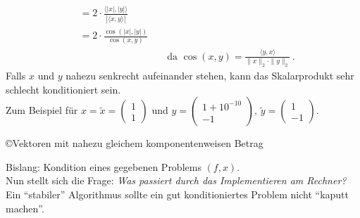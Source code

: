 \begin{Bspe}
\begin{enumerate}[a)]
\begin{align*}
                                                         &= 2\cdot \frac{\langle |x|,|y|\rangle}{|\langle x,y\rangle|} \\
                                                         &= 2 \cdot \frac{\cos(|x|, |y|)}{\cos(x,y)}  \\
                                                         &&&				\text{	da  }\cos(x,y) = \frac{\langle y,x \rangle}{\|x\|_2 \cdot \|y\|_2} \, . 
    \end{align*}
    Falls $x$ und $y$ nahezu senkrecht aufeinander stehen, kann das Skalarprodukt sehr schlecht konditioniert sein. \\
    Zum Beispiel für $x=\widetilde{x} = \begin{pmatrix} 1 \\1 \end{pmatrix}$
    und $y=\begin{pmatrix} 1+10^{-10} \\-1 \end{pmatrix},
    \, \widetilde{y}=\begin{pmatrix} 1 \\-1 \end{pmatrix}$. \\
    \begin{image}{\copyright Vektoren mit nahezu gleichem komponentenweisen Betrag}
    \end{image}
  \end{enumerate}	
\end{Bspe}

Bislang: Kondition eines gegebenen Problems $(f,x)$. \\
Nun stellt sich die Frage: \textit{Was passiert durch das Implementieren am Rechner? }\\
Ein \enquote{stabiler} Algorithmus sollte ein gut konditioniertes
Problem nicht \enquote{kaputt machen}.

